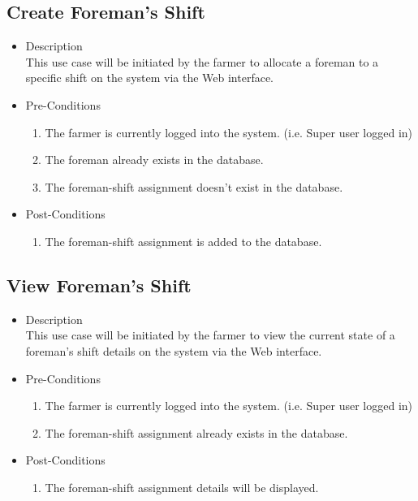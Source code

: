 \documentclass[11pt,fleqn]{book} %
\begin{document}
		\subsection{Create Foreman’s Shift}
		\begin{itemize}
			\item Description\\
			This use case will be initiated by the farmer to allocate a foreman to a specific shift on the system via the Web interface.
			\item Pre-Conditions
			\begin{enumerate}
				\item The farmer is currently logged into the system. (i.e. Super user logged in)
				\item The foreman already exists in the database. 
				\item The foreman-shift assignment doesn’t exist in the database.					
			\end{enumerate}
			\item Post-Conditions
			\begin{enumerate}
				\item The foreman-shift assignment is added to the database.
			\end{enumerate}
		\end{itemize}
		
		\subsection{View Foreman’s Shift}
		\begin{itemize}
			\item Description\\
			This use case will be initiated by the farmer to view the current state of a foreman’s shift details on the system via the Web interface.
			\item Pre-Conditions
			\begin{enumerate}
				\item The farmer is currently logged into the system. (i.e. Super user logged in)
				\item The foreman-shift assignment already exists in the database.		
			\end{enumerate}
			\item Post-Conditions
			\begin{enumerate}
				\item The foreman-shift assignment details will be displayed.
			\end{enumerate}
		\end{itemize}
		
\end{document}
